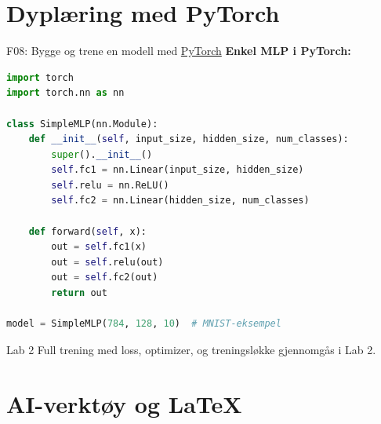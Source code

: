 \documentclass[aspectratio=169, 10pt]{beamer}
\begin{document}
\section{Dyplæring med PyTorch}

\begin{frame}[fragile]{F08: Bygge og trene en modell med \href{https://pytorch.org/}{PyTorch}}
    \textbf{Enkel MLP i PyTorch:}
    \begin{lstlisting}[language=Python,basicstyle=\ttfamily\scriptsize]
import torch
import torch.nn as nn

class SimpleMLP(nn.Module):
    def __init__(self, input_size, hidden_size, num_classes):
        super().__init__()
        self.fc1 = nn.Linear(input_size, hidden_size)
        self.relu = nn.ReLU()
        self.fc2 = nn.Linear(hidden_size, num_classes)

    def forward(self, x):
        out = self.fc1(x)
        out = self.relu(out)
        out = self.fc2(out)
        return out

model = SimpleMLP(784, 128, 10)  # MNIST-eksempel
    \end{lstlisting}

    \begin{block}{\footnotesize Lab 2}
        \footnotesize Full trening med loss, optimizer, og treningsløkke gjennomgås i Lab 2.
    \end{block}
\end{frame}

\section{AI-verktøy og LaTeX}
\end{document}
